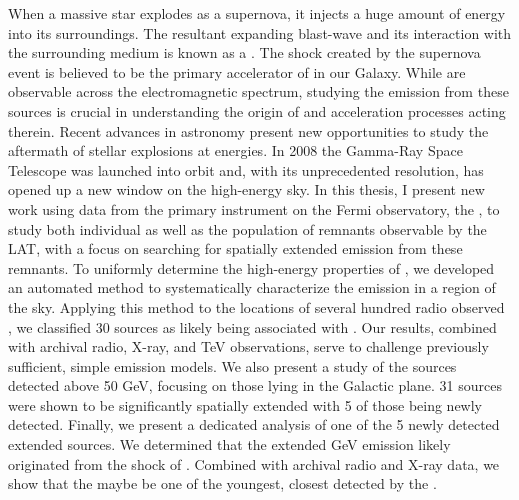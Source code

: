 \label{abstract}
When a massive star explodes as a supernova,  it injects a huge amount of energy into its surroundings. The resultant expanding blast-wave and its interaction with the surrounding medium is known as a \snr{}. The shock created by the supernova event is believed to be the primary accelerator of \crs{} in our Galaxy. While \snrs{} are observable across the electromagnetic spectrum, studying the \gam{} emission from these sources is crucial in understanding the origin of \crs{} and acceleration processes acting therein. Recent advances in \gam{} astronomy present new opportunities to study the aftermath of stellar explosions at \gam{} energies. In 2008 the \Fermi{} Gamma-Ray Space Telescope was launched into orbit and, with its unprecedented \gam{} resolution, has opened up a new window on the high-energy sky. In this thesis, I present new work using data from the primary instrument on the Fermi observatory, the \lat{}, to study both individual \snrs{} as well as the population of remnants observable by the LAT, with a focus on searching for spatially extended emission from these remnants.  To uniformly determine the high-energy properties of \snrs{}, we developed an automated method to systematically characterize the \gam{} emission in a region of the sky. Applying this method to the locations of several hundred radio observed \snrs{}, we classified 30 \gam{} sources as likely being associated with \snrs{}. Our results, combined with archival radio, X-ray, and TeV observations, serve to challenge previously sufficient, simple \gam{} \snr{} emission models. We also present a study of the sources detected above 50 GeV, focusing on those lying in the Galactic plane.  31 sources were shown to be significantly spatially extended with 5 of those being newly detected. Finally, we present a dedicated analysis of one of the 5 newly detected extended sources. We determined that the extended GeV emission likely originated from the shock of  \snr{} \Gone{}. Combined with archival radio and X-ray data, we show that the \snr{} maybe be one of the youngest, closest \gam{} \snrs{} detected by the \lat{}. %


